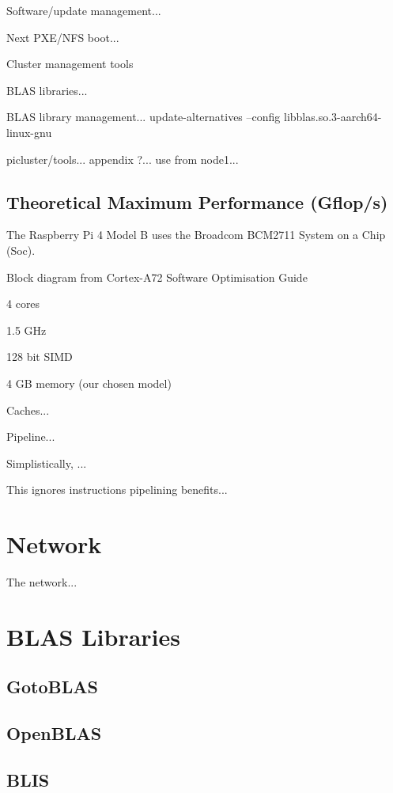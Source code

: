 \documentclass{report}
\begin{document}
Software/update management...

Next PXE/NFS boot...

Cluster management tools

BLAS libraries...

BLAS library management... update-alternatives --config libblas.so.3-aarch64-linux-gnu

picluster/tools... appendix ?... use from node1...


\subsection{Theoretical Maximum Performance (Gflop/s)}

The Raspberry Pi 4 Model B uses the Broadcom BCM2711 System on a Chip (Soc).

Block diagram from Cortex-A72 Software Optimisation Guide

4 cores

1.5 GHz

128 bit SIMD

4 GB memory (our chosen model)

Caches...

Pipeline...

Simplistically, ...

This ignores instructions pipelining benefits...


%
%
\section{Network}

The network...


%
%
\section{BLAS Libraries}

\subsection{GotoBLAS}

\subsection{OpenBLAS}

\subsection{BLIS}
\end{document}

